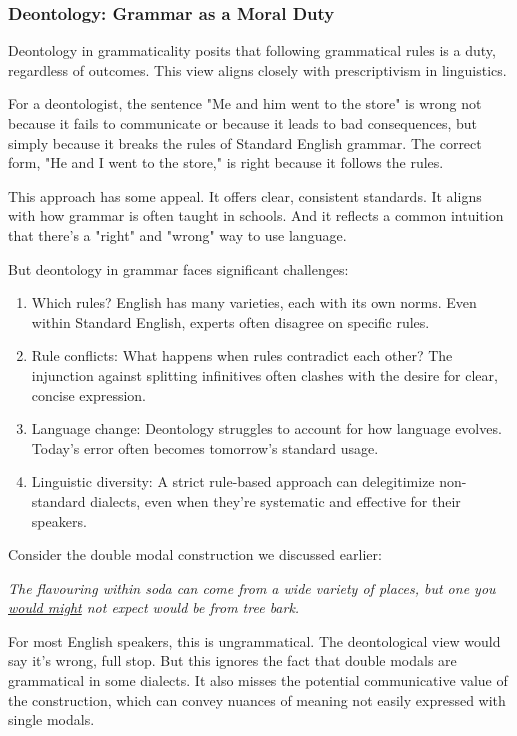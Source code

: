 \subsubsection{Deontology: Grammar as a Moral Duty}

Deontology in grammaticality posits that following grammatical rules is a duty, regardless of outcomes. This view aligns closely with prescriptivism in linguistics.

For a deontologist, the sentence "Me and him went to the store" is wrong not because it fails to communicate or because it leads to bad consequences, but simply because it breaks the rules of Standard English grammar. The correct form, "He and I went to the store," is right because it follows the rules.

This approach has some appeal. It offers clear, consistent standards. It aligns with how grammar is often taught in schools. And it reflects a common intuition that there's a "right" and "wrong" way to use language.

But deontology in grammar faces significant challenges:

\begin{enumerate}
    \item Which rules? English has many varieties, each with its own norms. Even within Standard English, experts often disagree on specific rules.
    
    \item Rule conflicts: What happens when rules contradict each other? The injunction against splitting infinitives often clashes with the desire for clear, concise expression.
    
    \item Language change: Deontology struggles to account for how language evolves. Today's error often becomes tomorrow's standard usage.
    
    \item Linguistic diversity: A strict rule-based approach can delegitimize non-standard dialects, even when they're systematic and effective for their speakers.
\end{enumerate}

Consider the double modal construction we discussed earlier:

\ea \textit{The flavouring within soda can come from a wide variety of places, but one you \uline{would might} not expect would be from tree bark.}
\z

For most English speakers, this is ungrammatical. The deontological view would say it's wrong, full stop. But this ignores the fact that double modals are grammatical in some dialects. It also misses the potential communicative value of the construction, which can convey nuances of meaning not easily expressed with single modals.

